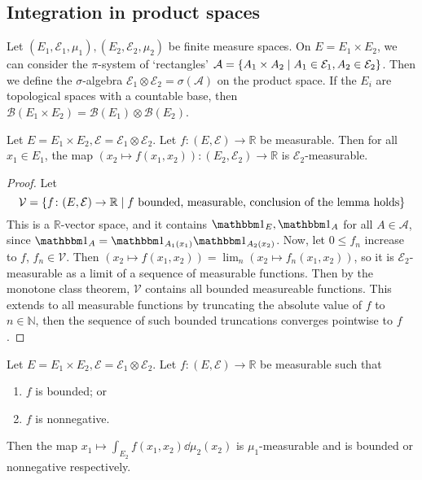 \subsection{Integration in product spaces}
Let \( (E_1, \mathcal E_1, \mu_1), (E_2, \mathcal E_2, \mu_2) \) be finite measure spaces.
On \( E = E_1 \times E_2 \), we can consider the \( \pi \)-system of `rectangles' \( \mathcal A = \qty{A_1 \times A_2 \mid A_1 \in \mathcal E_1, A_2 \in \mathcal E_2} \).
Then we define the \( \sigma \)-algebra \( \mathcal E_1 \otimes \mathcal E_2 = \sigma(\mathcal A) \) on the product space.
If the \( E_i \) are topological spaces with a countable base, then \( \mathcal B(E_1 \times E_2) = \mathcal B(E_1) \otimes \mathcal B(E_2) \).
\begin{lemma}
	Let \( E = E_1 \times E_2, \mathcal E = \mathcal E_1 \otimes \mathcal E_2 \).
	Let \( f \colon (E, \mathcal E) \to \mathbb R \) be measurable.
	Then for all \( x_1 \in E_1 \), the map \( (x_2 \mapsto f(x_1, x_2)) \colon (E_2, \mathcal E_2) \to \mathbb R \) is \( \mathcal E_2 \)-measurable.
\end{lemma}
\begin{proof}
	Let
	\[ \mathcal V = \qty{f \colon (E,\mathcal E) \to \mathbb R \mid f \text{ bounded, measurable, conclusion of the lemma holds}} \]
	This is a \( \mathbb R \)-vector space, and it contains \( \mathbbm 1_E, \mathbbm 1_A \) for all \( A \in \mathcal A \), since \( \mathbbm 1_A = \mathbbm 1_{A_1(x_1)} \mathbbm 1_{A_2(x_2)} \).
	Now, let \( 0 \leq f_n \) increase to \( f \), \( f_n \in \mathcal V \).
	Then \( (x_2 \mapsto f(x_1, x_2)) = \lim_n (x_2 \mapsto f_n(x_1, x_2)) \), so it is \( \mathcal E_2 \)-measurable as a limit of a sequence of measurable functions.
	Then by the monotone class theorem, \( \mathcal V \) contains all bounded measureable functions.
	This extends to all measurable functions by truncating the absolute value of \( f \) to \( n \in \mathbb N \), then the sequence of such bounded truncations converges pointwise to \( f \).
\end{proof}
\begin{lemma}
	Let \( E = E_1 \times E_2, \mathcal E = \mathcal E_1 \otimes \mathcal E_2 \).
	Let \( f \colon (E, \mathcal E) \to \mathbb R \) be measurable such that
	\begin{enumerate}
		\item \( f \) is bounded; or
		\item \( f \) is nonnegative.
	\end{enumerate}
	Then the map \( x_1 \mapsto \int_{E_2} f(x_1,x_2) \dd{\mu_2(x_2)} \) is \( \mu_1 \)-measurable and is bounded or nonnegative respectively.
\end{lemma}
